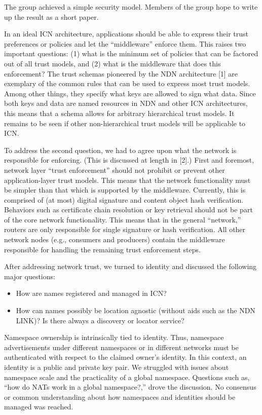 \documentclass[a4paper,UKenglish]{dagrep}
\begin{document}
The group achieved a simple security model. Members of the group hope to write up the result as a short paper.

\license

In an ideal ICN architecture, applications should be able to express their trust preferences or policies and let the ``middleware'' enforce them. This raises two important questions: (1) what is the minimum set of policies that can be factored out of all trust models, and (2) what is the middleware that does this enforcement? The trust schemas pioneered by the NDN architecture [1] are exemplary of the common rules that can be used to express most trust models. Among other things, they specify what keys are allowed to sign what data. Since both keys and data are named resources in NDN and other ICN architectures, this means that a schema allows for arbitrary hierarchical trust models. It remains to be seen if other non-hierarchical trust models will be applicable to ICN.

To address the second question, we had to agree upon what the network is responsible for enforcing. (This is discussed at length in [2].)
First and foremost, network layer ``trust enforcement'' should not prohibit or prevent other application-layer trust models. This means that the network functionality must be simpler than that which is supported by the middleware. Currently, this is comprised of (at most) digital signature and content object hash verification. Behaviors such as certificate chain resolution or key retrieval should not be part of the core network functionality. This means that in the general ``network,'' routers are only responsible for single signature or hash verification. All other network nodes (e.g., consumers and producers) contain the middleware responsible for handling the remaining trust enforcement steps.

After addressing network trust, we turned to identity and discussed the following major questions:
%
\begin{itemize}
\item How are names registered and managed in ICN?
\item How can names possibly be location agnostic (without aids such as the NDN LINK)? Is there always a discovery or locator service?
\end{itemize}
%
Namespace ownership is intrinsically tied to identity. Thus, namespace advertisements under different namespaces or in different networks must be authenticated with respect to the claimed owner's identity. In this context, an identity is a public and private key pair. We struggled with issues about namespace scale and the practicality of a global namespace. Questions such as, ``how do NATs work in a global namespace?,'' drove the discussion. No consensus or common understanding about how namespaces and identities should be managed was reached.
\end{document}
